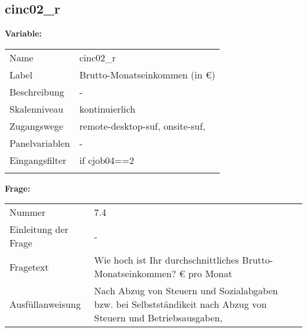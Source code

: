 	
	
	\subsection{cinc02\_r}
	\label{subSection:cinc02_r}

	\noindent\textbf{Variable:}\\
		\begin{tabular}{lL{11.3cm}}
			\label{tableVariable:cinc02_r}
			Name & cinc02\_r \\
			Label & Brutto-Monatseinkommen (in €) \\
			Beschreibung & - \\
			Skalenniveau & kontinuierlich \\
			Zugangswege &
				remote-desktop-suf,
				onsite-suf,
 \\
			Panelvariablen & -
			 \\
			Eingangsfilter & if cjob04==2 \\
 \\
		\end{tabular}

		\vspace*{1 cm}
		\noindent\textbf{Frage:}\\
		\begin{tabular}{lL{11.3cm}}
			\label{tableQuestion:cinc02_r}
			Nummer & 7.4 \\
			Einleitung der Frage & - \\
			Fragetext & Wie hoch ist Ihr durchschnittliches Brutto-Monatseinkommen?
€ pro Monat \\
			Ausfüllanweisung & Nach Abzug von Steuern und Sozialabgaben bzw. bei Selbstständikeit nach Abzug von Steuern und Betriebsausgaben, \\
		\end{tabular}




